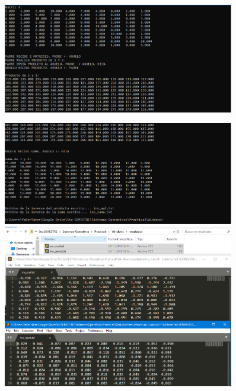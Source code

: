 \documentclass[12pt]{article}
\begin{document}
\begin{itemize}
\begin{figure}[h!]
                   \includegraphics[width=0.9\textwidth]{Practica6/Images/Windows/7_3.PNG}
                   
            \end{figure}
            \begin{figure}[h!]
                    \centering
                     \includegraphics[width=0.9\textwidth]{Practica6/Images/Windows/7_4.PNG}
                   \includegraphics[width=0.9\textwidth]{Practica6/Images/Windows/7_5.PNG}
                   
            \end{figure}
      \end{itemize}
\end{document}

